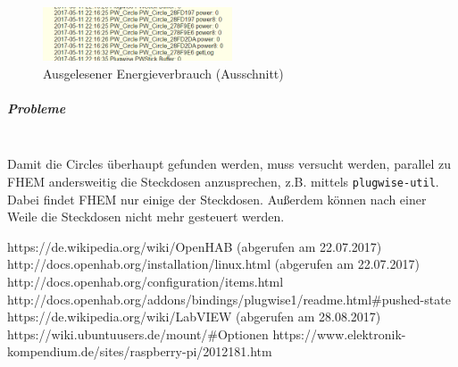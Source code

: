 \documentclass[enabledeprecatedfontcommands,12pt,oneside,pdftex]{scrbook}
\begin{document}
\begin{figure}[H]
  \caption{Ausgelesener Energieverbrauch (Ausschnitt)}
  \centering
  \includegraphics[width=0.5\textwidth]{FHEMPowerlogklein}
\end{figure}

\subparagraph{Probleme}\mbox{} \\
Damit die Circles überhaupt gefunden werden, muss versucht werden, parallel zu FHEM andersweitig die Steckdosen anzusprechen, z.B. mittels \texttt{plugwise-util}. Dabei findet FHEM nur einige der Steckdosen. Außerdem können nach einer Weile die Steckdosen nicht mehr gesteuert werden.\newline \newline






\begin{thebibliography}{99}
https://de.wikipedia.org/wiki/OpenHAB (abgerufen am 22.07.2017)
http://docs.openhab.org/installation/linux.html (abgerufen am 22.07.2017)
http://docs.openhab.org/configuration/items.html
http://docs.openhab.org/addons/bindings/plugwise1/readme.html\#pushed-state
https://de.wikipedia.org/wiki/LabVIEW (abgerufen am 28.08.2017)
https://wiki.ubuntuusers.de/mount/\#Optionen
https://www.elektronik-kompendium.de/sites/raspberry-pi/2012181.htm
\end{thebibliography}
\end{document}
